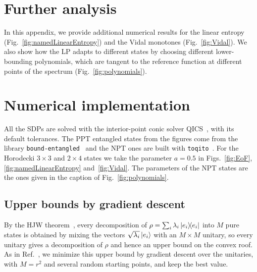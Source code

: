 \documentclass[aps,pra,twocolumn,showpacs,superscriptaddress,groupedaddress]{revtex4-2}
\begin{document}
\begin{widetext}
\section{Further analysis}
In this appendix, we provide additional numerical results for the linear entropy (Fig.~\ref{fig:namedLinearEntropy}) and the Vidal monotones (Fig.~\ref{fig:Vidal}).
We also show how the LP adapts to different states by choosing different lower-bounding polynomials, which are tangent to the reference function at different points of the spectrum (Fig.~\ref{fig:polynomials}).




% 


\section{Numerical implementation}\label{app:numerics}
All the SDPs are solved with the interior-point conic solver QICS~\cite{qics}, with its default tolerances.
The PPT entangled states from the figures come from the library \texttt{bound-entangled}~\cite{boundEntangled} and the NPT ones are built with \texttt{toqito}~\cite{toqito}. For the Horodecki $3\times3$ and $2\times4$ states we take the parameter $a=0.5$ in Figs.~\ref{fig:EoF}, \ref{fig:namedLinearEntropy} and~\ref{fig:Vidal}. The parameters of the NPT states are the ones given in the caption of Fig.~\ref{fig:polynomials}.

\subsection{Upper bounds by gradient descent}\label{app:HJW}
By the HJW theorem~\cite{HJW}, every decomposition of $\rho=\sum_i\lambda_i\dyad{e_i}$ 
into $M$ pure states is obtained
by mixing the vectors $\sqrt{\lambda_i}\ket{e_i}$ with an $M\times M$ unitary, so every unitary gives a decomposition of
$\rho$ and hence an upper bound on the convex roof. As in Ref.~\cite{Rothlisberger2009}, we minimize this upper bound by
gradient descent over the unitaries, with $M=r^2$ and several random starting points, and keep the best value.



\end{widetext}
\end{document}
